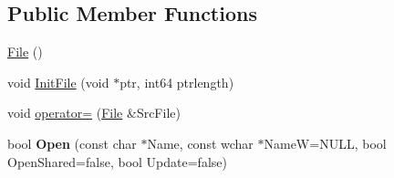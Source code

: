 \subsection*{Public Member Functions}
\begin{DoxyCompactItemize}
\item 
\hyperlink{class_file_ae039af5807fc385f41b60644725d15d0}{File} ()
\item 
void \hyperlink{class_file_ad25e907c17d68a3c0b72767a0390c500}{Init\-File} (void $\ast$ptr, int64 ptrlength)
\item 
void \hyperlink{class_file_af9b1f4f397084898a59a34fed18dad26}{operator=} (\hyperlink{class_file}{File} \&Src\-File)
\item 
\hypertarget{class_file_a705794d712d3425858778944004642a5}{bool {\bfseries Open} (const char $\ast$Name, const wchar $\ast$Name\-W=N\-U\-L\-L, bool Open\-Shared=false, bool Update=false)}\label{class_file_a705794d712d3425858778944004642a5}


\end{DoxyCompactItemize}
